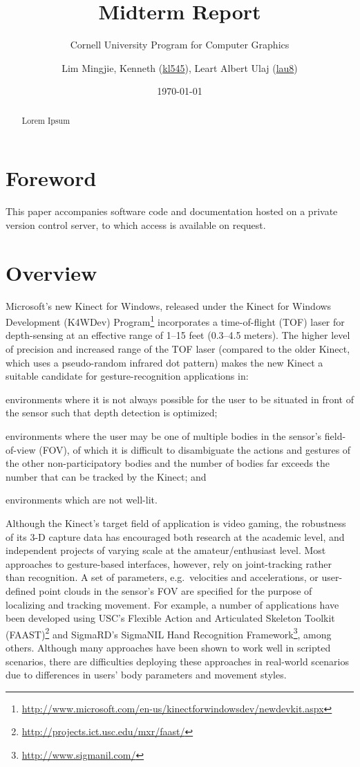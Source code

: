 \documentclass{scrartcl}
\title{Midterm Report}
\subtitle{Cornell University Program for Computer Graphics}
\author{Lim Mingjie, Kenneth (\href{mailto:kl545@cornell.edu}{kl545}), Leart Albert Ulaj (\href{mailto:lau8@cornell.edu}{lau8})}
\date{\today}
\numberwithin{equation}{section}
\begin{document}
  \maketitle
  \begin{abstract}
    Lorem Ipsum
  \end{abstract}
  \tableofcontents
  \newpage
  \section{Foreword}
    This paper accompanies software code and documentation hosted on a private version control server, to which access is available on request.
  \section{Overview}
    Microsoft's new Kinect for Windows, released under the Kinect for Windows Development (K4WDev) Program\footnote{\url{http://www.microsoft.com/en-us/kinectforwindowsdev/newdevkit.aspx}} incorporates a time-of-flight (TOF) laser for depth-sensing at an effective range of 1--15 feet (0.3--4.5 meters). The higher level of precision and increased range of the TOF laser (compared to the older Kinect, which uses a pseudo-random infrared dot pattern) makes the new Kinect a suitable candidate for gesture-recognition applications in:\begin{inparaenum}[(1)]
      \item environments where it is not always possible for the user to be situated in front of the sensor such that depth detection is optimized;
      \item environments where the user may be one of multiple bodies in the sensor's field-of-view (FOV), of which it is difficult to disambiguate the actions and gestures of the other non-participatory bodies and the number of bodies far exceeds the number that can be tracked by the Kinect; and
      \item environments which are not well-lit.
    \end{inparaenum}

    Although the Kinect's target field of application is video gaming, the robustness of its 3-D capture data has encouraged both research at the academic level, and independent projects of varying scale at the amateur/enthusiast level. Most approaches to gesture-based interfaces, however, rely on joint-tracking rather than recognition. A set of parameters, e.g.~velocities and accelerations, or user-defined point clouds in the sensor's FOV are specified for the purpose of localizing and tracking movement. For example, a number of applications have been developed using USC's Flexible Action and Articulated Skeleton Toolkit (FAAST)\footnote{\url{http://projects.ict.usc.edu/mxr/faast/}} and SigmaRD's SigmaNIL Hand Recognition Framework\footnote{\url{http://www.sigmanil.com/}}, among others. Although many approaches have been shown to work well in scripted scenarios, there are difficulties deploying these approaches in real-world scenarios due to differences in users' body parameters and movement styles.
\end{document}
